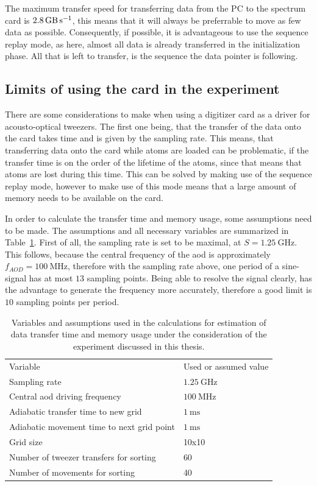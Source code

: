 The maximum transfer speed for transferring data from the PC to the spectrum card is $\SI{2.8}{\giga\byte\per\second}$, this means that it will always be preferrable to move as few data as possible. Consequently, if possible, it is advantageous to use the sequence replay mode, as here, almost all data is already transferred in the initialization phase. All that is left to transfer, is the sequence the data pointer is following.

\subsection{Limits of using the card in the experiment}

There are some considerations to make when using a digitizer card as a driver for acousto-optical tweezers. The first one being, that the transfer of the data onto the card takes time and is given by the sampling rate. This means, that transferring data onto the card while atoms are loaded can be problematic, if the transfer time is on the order of the lifetime of the atoms, since that means that atoms are lost during this time. This can be solved by making use of the sequence replay mode, however to make use of this mode means that a large amount of memory needs to be available on the card.

In order to calculate the transfer time and memory usage, some assumptions need to be made. The assumptions and all necessary variables are summarized in Table~\ref{tbl:spectrum_assumptions}. First of all, the sampling rate is set to be maximal, at $S=\SI{1.25}{\giga\hertz}$. This follows, because the central frequency of the \ac{aod} is approximately $f_{AOD}=\SI{100}{\mega\hertz}$, therefore with the sampling rate above, one period of a sine-signal has at most $13$ sampling points. Being able to resolve the signal clearly, has the advantage to generate the frequency more accurately, therefore a good limit is $10$ sampling points per period.

\begin{table}[tb]
\label{tbl:spectrum_assumptions}
\centering
\begin{tabular}{l|l}
	\hline \hline
	Variable & Used or assumed value \\ \thickhline
	Sampling rate & $\SI{1.25}{\giga\hertz}$ \\
	Central \ac{aod} driving frequency & $\SI{100}{\mega\hertz}$ \\
	Adiabatic transfer time to new grid & $\SI{1}{\milli\second}$ \\
	Adiabatic movement time to next grid point & $\SI{1}{\milli\second}$ \\
	Grid size & 10x10 \\
	Number of tweezer transfers for sorting & 60 \\
	Number of movements for sorting & 40 \\
	\hline \hline
\end{tabular}
\caption{Variables and assumptions used in the calculations for estimation of data transfer time and memory usage under the consideration of the experiment discussed in this thesis.}
\end{table}

